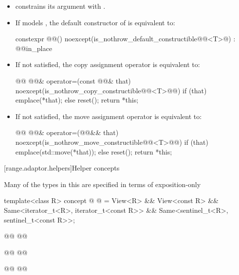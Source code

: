 \begin{itemize}
\item {} constrains its argument
with .

\item If  models , the default
constructor of  is equivalent to:
\begin{codeblock}
constexpr @@()
  noexcept(is_nothrow_default_constructible@@<T>@)
  : @@{in_place}
{ }
\end{codeblock}

\item If 
   not
satisfied, the copy assignment operator is equivalent to:
\begin{codeblock}
@@ @@& operator=(const @@& that)
  noexcept(is_nothrow_copy_constructible@@<T>@@)
{
  if (that) emplace(*that);
  else reset();
  return *this;
}
\end{codeblock}

\item If 
   not satisfied,
the move assignment operator is equivalent to:
\begin{codeblock}
@@ @@& operator=(@@&& that)
  noexcept(is_nothrow_move_constructible@@<T>@@)
{
  if (that) emplace(std::move(*that));
  else reset();
  return *this;
}
\end{codeblock}
\end{itemize}

[range.adaptor.helpers]{Helper concepts}

\pnum
Many of the types in this   are specified in
terms of   exposition-only 

\begin{codeblock}
template<class R>
concept @ @ =
  View<R> && View<const R> &&
  Same<iterator_t<R>, iterator_t<const R>> &&
  Same<sentinel_t<R>, sentinel_t<const R>>;

@@
  @@

@@
  @@

@@
@@
\end{codeblock}

